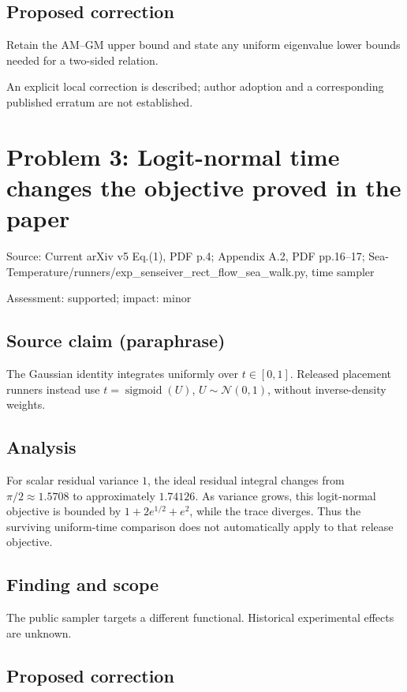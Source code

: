 \documentclass[11pt]{article}
\begin{document}
\subsection*{Proposed correction}

Retain the AM–GM upper bound and state any uniform eigenvalue lower bounds needed for a two-sided relation.

An explicit local correction is described; author adoption and a corresponding published erratum are not established.

\section*{Problem 3: Logit-normal time changes the objective proved in the paper}

Source: Current arXiv v5 Eq.(1), PDF p.4; Appendix A.2, PDF pp.16–17; Sea-Temperature/runners/exp\_senseiver\_rect\_flow\_sea\_walk.py, time sampler

Assessment: supported; impact: minor

\subsection*{Source claim (paraphrase)}

The Gaussian identity integrates uniformly over \(t\in[0,1]\). Released placement runners instead use \(t=\operatorname{sigmoid}(U)\), \(U\sim\mathcal N(0,1)\), without inverse-density weights.

\subsection*{Analysis}

For scalar residual variance \(1\), the ideal residual integral changes from \(\pi/2\approx1.5708\) to approximately \(1.74126\). As variance grows, this logit-normal objective is bounded by \(1+2e^{1/2}+e^2\), while the trace diverges. Thus the surviving uniform-time comparison does not automatically apply to that release objective.

\subsection*{Finding and scope}

The public sampler targets a different functional. Historical experimental effects are unknown.

\subsection*{Proposed correction}
\end{document}

